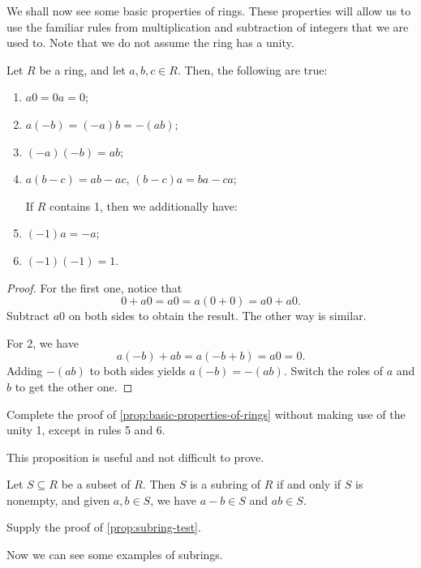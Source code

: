 \documentclass[./main.tex]{subfiles}
\begin{document}
We shall now see some basic properties of rings. These properties will allow us
to use the familiar rules from multiplication and subtraction of integers that
we are used to. Note that we do not assume the ring has a unity.
\begin{proposition}
\label{prop:basic-properties-of-rings}
    Let $R$ be a ring, and let $a, b, c \in R$.
    Then, the following are true:
    \begin{enumerate}
        \item $a0 = 0a = 0$;
        \item $a(-b) = (-a)b = -(ab)$;
        \item $(-a)(-b) = ab$;
        \item $a(b-c) = ab -ac$, $(b-c)a = ba-ca$;
        
        If $R$ contains 1, then we additionally have:
        \item $(-1)a = -a$;
        \item $(-1)(-1) = 1$.
    \end{enumerate}
\end{proposition}
\begin{proof}
    For the first one, notice that 
    \[
        0 + a0 = a0 = a(0+0) = a0 + a0.
    \]
    Subtract $a0$ on both sides to obtain the result. The other way is similar.

    For 2, we have 
    \[
        a(-b) + ab = a(-b + b) = a0 = 0.
    \]
    Adding $-(ab)$ to both sides yields $a(-b) = -(ab)$. Switch the roles of $a$
    and $b$ to get the other one.
\end{proof}

\begin{exercise}
    Complete the proof of \cref{prop:basic-properties-of-rings} without making
    use of the unity 1, except in rules 5 and 6.
\end{exercise}

This proposition is useful and not difficult to prove.
\begin{proposition}
\label{prop:subring-test}
    Let $S \subseteq R$ be a subset of $R$. Then $S$ is a subring of $R$ if and
    only if $S$ is nonempty, and given $a, b \in S$, we have $a-b \in S$ and $ab
    \in S$.
\end{proposition}
\begin{exercise}
    Supply the proof of \cref{prop:subring-test}.
\end{exercise}

Now we can see some examples of subrings.
\end{document}
